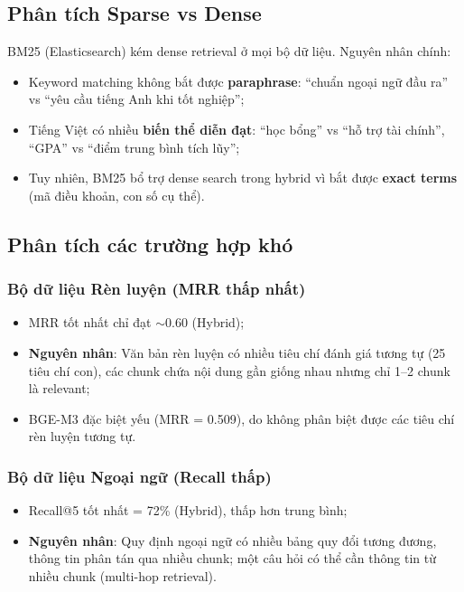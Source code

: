 \documentclass[../DoAn.tex]{subfiles}
\begin{document}
\subsection{Phân tích Sparse vs Dense}

BM25 (Elasticsearch) kém dense retrieval ở mọi bộ dữ liệu. Nguyên nhân chính:
\begin{itemize}
    \item Keyword matching không bắt được \textbf{paraphrase}: ``chuẩn ngoại ngữ đầu ra'' vs ``yêu cầu tiếng Anh khi tốt nghiệp'';
    \item Tiếng Việt có nhiều \textbf{biến thể diễn đạt}: ``học bổng'' vs ``hỗ trợ tài chính'', ``GPA'' vs ``điểm trung bình tích lũy'';
    \item Tuy nhiên, BM25 bổ trợ dense search trong hybrid vì bắt được \textbf{exact terms} (mã điều khoản, con số cụ thể).
\end{itemize}

\subsection{Phân tích các trường hợp khó}

\subsubsection{Bộ dữ liệu Rèn luyện (MRR thấp nhất)}
\begin{itemize}
    \item MRR tốt nhất chỉ đạt $\sim$0.60 (Hybrid);
    \item \textbf{Nguyên nhân}: Văn bản rèn luyện có nhiều tiêu chí đánh giá tương tự (25 tiêu chí con), các chunk chứa nội dung gần giống nhau nhưng chỉ 1--2 chunk là relevant;
    \item BGE-M3 đặc biệt yếu (MRR = 0.509), do không phân biệt được các tiêu chí rèn luyện tương tự.
\end{itemize}

\subsubsection{Bộ dữ liệu Ngoại ngữ (Recall thấp)}
\begin{itemize}
    \item Recall@5 tốt nhất = 72\% (Hybrid), thấp hơn trung bình;
    \item \textbf{Nguyên nhân}: Quy định ngoại ngữ có nhiều bảng quy đổi tương đương, thông tin phân tán qua nhiều chunk; một câu hỏi có thể cần thông tin từ nhiều chunk (multi-hop retrieval).
\end{itemize}
\end{document}
